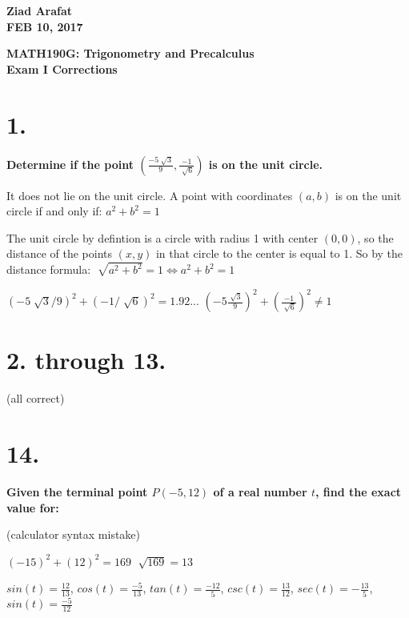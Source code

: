 \documentclass{article}%
\begin{document}
\begin{flushright}
\textbf{Ziad Arafat \\
FEB 10, 2017}
\end{flushright}

\begin{center}
\textbf{MATH190G: Trigonometry and Precalculus \\
Exam I Corrections} \\
\end{center}
\section*{1.}
\textbf{Determine if the point $(\frac{-5\sqrt[]{3}}{9}, \frac{-1}{\sqrt[]{6}})$ is on the unit circle.}
\begin{center}
It does not lie on the unit circle.
A point with coordinates $(a,b)$ is on the unit circle if and only if: \newline
$a^2 + b^2 = 1$

The unit circle by defintion is a circle with radius 1 with center $(0,0)$, so the distance of the points $(x,y)$ in that circle to the center is equal to 1. So by the distance formula: \newline
$\sqrt[]{a^2+b^2} = 1 \iff a^2+b^2=1$

$(-5 \sqrt[]{3}/9)^2 + (-1/\sqrt[]{6})^2 = 1.92...$ \newline
$(-5 \frac{\sqrt[]{3}}{9})^2 + (\frac{-1}{\sqrt[]{6}})^2 \neq 1$
\end{center}
\section*{2. through 13.}
\begin{small}
(all correct)
\end{small}

\section*{14.}
\textbf{Given the terminal point $P(-5, 12)$ of a real number $t$, find the exact value for: }

(calculator syntax mistake)
\begin{center}
$(-15)^2 + (12)^2 = 169$ \newline
$\sqrt[]{169} = 13$ \newline

$sin(t) = \frac{12}{13}$, $cos(t) = \frac{-5}{13}$, $tan(t) = \frac{-12}{5}$, $csc(t) = \frac{13}{12}$, $sec(t) = -\frac{13}{5}$, $sin(t) = \frac{-5}{12}$ 

\end{center}
\end{document}
